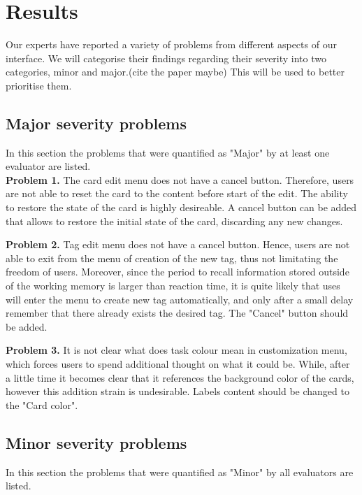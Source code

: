 \section{Results}

Our experts have reported a variety of problems from different aspects of our interface. We will categorise their findings regarding their severity into two categories, minor and major.(cite the paper maybe) This will be used to better prioritise them. 

\subsection{Major severity problems}

In this section the problems that were quantified as "Major" by at least one evaluator are listed. \\

\noindent
\textbf{Problem 1.} The card edit menu does not have a cancel button. Therefore, users are not able to reset the card to the content before start of the edit. The ability to restore the state of the card is highly desireable. A cancel button can be added that allows to restore the initial state of the card, discarding any new changes.

\noindent
\textbf{Problem 2.} Tag edit menu does not have a cancel button. Hence, users are not able to exit from the menu of creation of the new tag, thus not limitating the freedom of users. Moreover, since the period to recall information stored outside of the working memory is larger than reaction time, it is quite likely that uses will enter the menu to create new tag automatically, and only after a small delay remember that there already exists the desired tag. The "Cancel" button should be added.

\noindent
\textbf{Problem 3.} It is not clear what does task colour mean in customization menu, which forces users to spend additional thought on what it could be. While, after a little time it becomes clear that it references the background color of the cards, however this addition strain is undesirable. Labels content should be changed to the "Card color".

\subsection{Minor severity problems}

In this section the problems that were quantified as "Minor" by all evaluators are listed. \\

